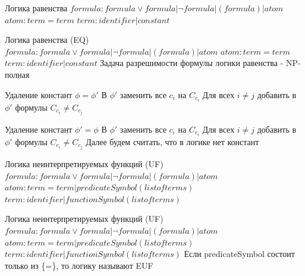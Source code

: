 \documentclass{beamer}
\begin{document}
\begin{frame}{Логика равенства}
$formula: formula \vee formula | \lnot formula | (formula) | atom$\newline
$atom: term = term$\newline
$term: identifier | constant$\newline
\end{frame}

\begin{frame}{Логика равенства (EQ)}
$formula: formula \vee formula | \lnot formula | (formula) | atom$\newline
$atom: term = term$\newline
$term: identifier | constant$\newline
Задача разрешимости формулы логики равенства - NP-полная\newline
\end{frame}

\begin{frame}{Удаление констант}
$\phi = \phi'$\newline
В $\phi'$ заменить все $c_i$ на $C_{c_i}$\newline
Для всех $i \neq j$ добавить в $\phi'$ формулы $C_{c_i} \neq C_{c_j}$
\end{frame}

\begin{frame}{Удаление констант}
$\phi' = \phi$\newline
В $\phi'$ заменить все $c_i$ на $C_{c_i}$\newline
Для всех $i \neq j$ добавить в $\phi'$ формулы $C_{c_i} \neq C_{c_j}$\newline
Далее будем считать, что в логике нет констант
\end{frame}

\begin{frame}{Логика неинтерпретируемых функций (UF)}
$formula: formula \vee formula | \lnot formula | (formula) | atom$\newline
$atom: term = term| predicateSymbol(list of terms)$\newline
$term: identifier | functionSymbol(list of terms)$\newline
\end{frame}

\begin{frame}{Логика неинтерпретируемых функций (UF)}
$formula: formula \vee formula | \lnot formula | (formula) | atom$\newline
$atom: term = term| predicateSymbol(list of terms)$\newline
$term: identifier | functionSymbol(list of terms)$\newline
Если predicateSymbol состоит только из \{=\}, то логику называют EUF
\end{frame}
\end{document}
